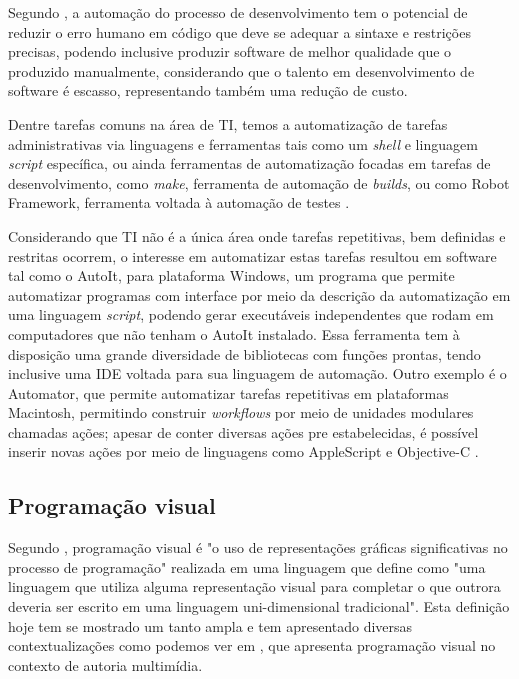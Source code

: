 \documentclass[12pt]{article}
\begin{document}
	Segundo \citeauthor{automionSoftEvolutionEffect}\cite{automionSoftEvolutionEffect}, a automação do processo de desenvolvimento tem o potencial de reduzir o erro humano em código que deve se adequar a sintaxe e restrições precisas, podendo inclusive produzir software de melhor qualidade que o produzido manualmente, considerando que o talento em desenvolvimento de software é escasso, representando também uma redução de custo. 
	
	Dentre tarefas comuns na área de TI, temos a automatização de tarefas administrativas via linguagens e ferramentas tais como um \emph{shell} e linguagem \emph{script} específica, ou ainda ferramentas de automatização focadas em tarefas de desenvolvimento, como \emph{make}, ferramenta de automação de \emph{builds}, ou como Robot Framework, ferramenta voltada à automação de testes \cite{shell,make,robotFW}.

	Considerando que TI não é a única área onde tarefas repetitivas, bem definidas e restritas ocorrem, o interesse em automatizar estas tarefas resultou em software tal como o AutoIt\cite{autoit}, para plataforma Windows, um programa que permite automatizar programas com interface por meio da descrição da automatização em uma linguagem \emph{script}, podendo gerar executáveis independentes que rodam em computadores que não tenham o AutoIt instalado. Essa ferramenta tem à disposição uma grande diversidade de bibliotecas com funções prontas, tendo inclusive uma IDE voltada para sua linguagem de automação. Outro exemplo é o Automator, que permite automatizar tarefas repetitivas em plataformas Macintosh, permitindo construir \emph{workflows} por meio de unidades modulares chamadas ações; apesar de conter diversas ações pre estabelecidas, é possível inserir novas ações por meio de linguagens como AppleScript e Objective-C \cite{automator}.
	

	\subsection{Programação visual}
	
	Segundo \citeauthor{visualProgram}\cite{visualProgram}, programação visual é "o uso de representações gráficas significativas no processo de programação" realizada em uma linguagem que \citeauthor{visualProgram} define como "uma linguagem que utiliza alguma representação visual para completar o que outrora deveria ser escrito em uma linguagem uni-dimensional tradicional". Esta definição hoje tem se mostrado um tanto ampla e tem apresentado diversas contextualizações como podemos ver em \cite{visualProgAuth}, que apresenta programação visual no contexto de autoria multimídia.
	
\end{document}
